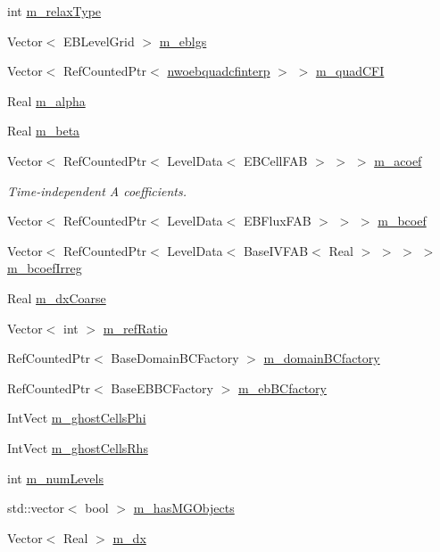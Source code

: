 \begin{DoxyCompactItemize}
\item 
int \hyperlink{classnwoebconductivityopfactory_a8c6d398c78dc50f3713a9bbb24c93bc4}{m\+\_\+relax\+Type}
\item 
Vector$<$ E\+B\+Level\+Grid $>$ \hyperlink{classnwoebconductivityopfactory_a1abceca979866aec0b4e4d9dc9dc08b6}{m\+\_\+eblgs}
\item 
Vector$<$ Ref\+Counted\+Ptr$<$ \hyperlink{classnwoebquadcfinterp}{nwoebquadcfinterp} $>$ $>$ \hyperlink{classnwoebconductivityopfactory_a4837043fab49fb84922e908d48be775b}{m\+\_\+quad\+C\+FI}
\item 
Real \hyperlink{classnwoebconductivityopfactory_a869f008bc3c252ce50bbc741118dd367}{m\+\_\+alpha}
\item 
Real \hyperlink{classnwoebconductivityopfactory_a759ca030cc2fc98b57ccda0f891226cd}{m\+\_\+beta}
\item 
Vector$<$ Ref\+Counted\+Ptr$<$ Level\+Data$<$ E\+B\+Cell\+F\+AB $>$ $>$ $>$ \hyperlink{classnwoebconductivityopfactory_a048118a5bb6a6793dd7744c133f329aa}{m\+\_\+acoef}
\begin{DoxyCompactList}\small\item\em Time-\/independent A coefficients. \end{DoxyCompactList}\item 
Vector$<$ Ref\+Counted\+Ptr$<$ Level\+Data$<$ E\+B\+Flux\+F\+AB $>$ $>$ $>$ \hyperlink{classnwoebconductivityopfactory_a249acbf22e8c4cffc323ba372d4d9427}{m\+\_\+bcoef}
\item 
Vector$<$ Ref\+Counted\+Ptr$<$ Level\+Data$<$ Base\+I\+V\+F\+AB$<$ Real $>$ $>$ $>$ $>$ \hyperlink{classnwoebconductivityopfactory_aeed39483ed17f89fe179d4e8a30d4009}{m\+\_\+bcoef\+Irreg}
\item 
Real \hyperlink{classnwoebconductivityopfactory_a9fd6b8c8299421af2eec3b3b02415094}{m\+\_\+dx\+Coarse}
\item 
Vector$<$ int $>$ \hyperlink{classnwoebconductivityopfactory_ab6b52246db7083497333dce7ee505ddb}{m\+\_\+ref\+Ratio}
\item 
Ref\+Counted\+Ptr$<$ Base\+Domain\+B\+C\+Factory $>$ \hyperlink{classnwoebconductivityopfactory_a0c8345b7c0efb90885a93d1d03064add}{m\+\_\+domain\+B\+Cfactory}
\item 
Ref\+Counted\+Ptr$<$ Base\+E\+B\+B\+C\+Factory $>$ \hyperlink{classnwoebconductivityopfactory_a82c9f54cba8a6cfa83a1965189c4ce17}{m\+\_\+eb\+B\+Cfactory}
\item 
Int\+Vect \hyperlink{classnwoebconductivityopfactory_a7894598ddddefae72cb1f5042694a5c9}{m\+\_\+ghost\+Cells\+Phi}
\item 
Int\+Vect \hyperlink{classnwoebconductivityopfactory_ab3e8b54159443f7dbec0d53dd09ddd7b}{m\+\_\+ghost\+Cells\+Rhs}
\item 
int \hyperlink{classnwoebconductivityopfactory_aed5082e49870dd931f816990ffe73bcc}{m\+\_\+num\+Levels}
\item 
std\+::vector$<$ bool $>$ \hyperlink{classnwoebconductivityopfactory_a9be42c2983f8fd64cadd8957971ecfab}{m\+\_\+has\+M\+G\+Objects}
\item 
Vector$<$ Real $>$ \hyperlink{classnwoebconductivityopfactory_a6fc0b58b8908dfa7c89cd1649a3ee2c5}{m\+\_\+dx}
\end{DoxyCompactItemize}
